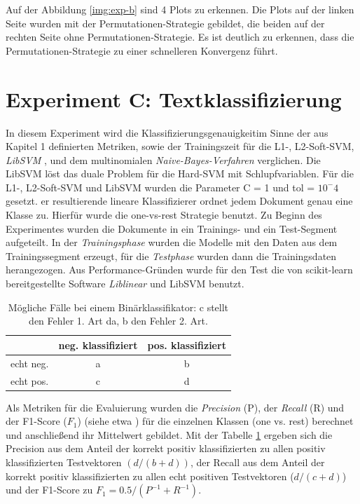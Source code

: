 Auf der Abbildung \ref{img:exp-b} sind 4 Plots zu erkennen. Die Plots auf der linken Seite wurden mit der Permutationen-Strategie gebildet, die beiden auf der rechten Seite ohne Permutationen-Strategie. Es ist deutlich zu erkennen, dass die Permutationen-Strategie zu einer schnelleren Konvergenz führt.

\section{Experiment C: Textklassifizierung} \label{sec:exp-c}
In diesem Experiment wird die Klassifizierungsgenauigkeitim Sinne der aus Kapitel 1 definierten Metriken, sowie der Trainingszeit für die L1-, L2-Soft-SVM, \emph{LibSVM} \cite{chang-libsvm-11}, und dem multinomialen \emph{Naive-Bayes-Verfahren} verglichen. Die LibSVM löst das duale Problem für die Hard-SVM mit Schlupfvariablen. Für die L1-, L2-Soft-SVM und  LibSVM wurden die Parameter C = 1 und tol = $10^-4$ gesetzt. er resultierende lineare Klassifizierer ordnet jedem Dokument genau eine Klasse zu. Hierfür wurde die one-vs-rest Strategie benutzt. Zu Beginn des Experimentes wurden die Dokumente in ein Trainings- und ein Test-Segment aufgeteilt. In der \emph{Trainingsphase} wurden die Modelle mit den Daten aus dem Trainingssegment erzeugt, für die \emph{Testphase} wurden dann die Trainingsdaten herangezogen. Aus Performance-Gründen wurde für den Test die von scikit-learn bereitgestellte Software \emph{Liblinear} \cite{fan-liblinear-08} und LibSVM benutzt.

\begin{table}[h!]
	\centering
	\begin{tabular}{|l | c | c |}
		\hline
		& neg. klassifiziert & pos. klassifiziert \\
		\hline 
		echt neg. & a & b \\
		\hline 
		echt pos. & c & d \\
		\hline
	\end{tabular}
	\caption{Mögliche Fälle bei einem Binärklassifikator: c stellt den Fehler 1. Art da, b den Fehler 2. Art.}
	\label{tab:fehlerarten}
\end{table}

Als Metriken für die Evaluierung wurden die \emph{Precision} (P), der \emph{Recall} (R) und der F1-Score ($F_1$)  (siehe etwa \cite{f-ir}) für die einzelnen Klassen (one vs. rest) berechnet und anschließend ihr Mittelwert gebildet. Mit der Tabelle \ref{tab:fehlerarten} ergeben sich die Precision aus dem Anteil der korrekt positiv klassifizierten zu allen positiv klassifizierten Testvektoren $(d/(b+d))$, der Recall aus dem Anteil der korrekt positiv klassifizierten zu allen echt positiven Testvektoren ($d/(c+d)$) und der F1-Score zu $F_1 = 0.5 / (P^{-1} + R^{-1})$. \\

